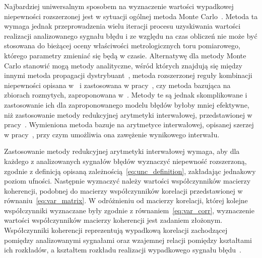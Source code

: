 Najbardziej uniwersalnym sposobem na wyznaczenie wartości wypadkowej niepewności rozszerzonej jest w sytuacji ogólnej metoda Monte Carlo~\cite{jcgm_montecarlo}. Metoda ta wymaga jednak przeprowadzenia wielu iteracji procesu uzyskiwania wartości realizacji analizowanego sygnału błędu i ze względu na czas obliczeń nie może być stosowana do bieżącej oceny właściwości metrologicznych toru pomiarowego, którego parametry zmieniać się będą w czasie. Alternatywę dla metody Monte Carlo stanowić mogą metody analityczne, wśród których znajdują się między innymi metoda propagacji dystrybuant~\cite{koliander_fusion, zhang_pdp}, metoda rozszerzonej reguły kombinacji niepewności opisana w~\cite{dieck_measurement} i zastosowana w pracy~\cite{yang_euc}, czy metoda bazująca na zbiorach rozmytych, zaproponowana w~\cite{urbanski_fuzzy}. Metody te są jednak skomplikowane i zastosowanie ich dla zaproponowanego modelu błędów byłoby mniej efektywne, niż zastosowanie metody redukcyjnej arytmetyki interwałowej, przedstawionej w pracy~\cite{jakubiec_redmono}. Wymieniona metoda bazuje na arytmetyce interwałowej, opisanej szerzej w pracy~\cite{moore_interval}, przy czym umożliwia ona zawężenie wynikowego interwału.

Zastosowanie metody redukcyjnej arytmetyki interwałowej wymaga, aby dla każdego z analizowanych sygnałów błędów wyznaczyć niepewność rozszerzoną, zgodnie z definicją opisaną zależnością~\eqref{eq:unc_definition}, zakładając jednakowy poziom ufności. Następnie wyznaczyć należy wartości współczynników macierzy koherencji, podobnej do macierzy współczynników korelacji przedstawionej w równaniu~\eqref{eq:var_matrix}. W odróżnieniu od macierzy korelacji, której kolejne współczynniki wyznaczane były zgodnie z równaniem~\eqref{eq:var_corr}, wyznaczenie wartości współczynników macierzy koherencji jest zadaniem złożonym. Współczynniki koherencji reprezentują wypadkową korelacji zachodzącej pomiędzy analizowanymi sygnałami oraz wzajemnej relacji pomiędzy kształtami ich rozkładów, a kształtem rozkładu realizacji wypadkowego sygnału błędu~\cite{jakubiec_system}.

